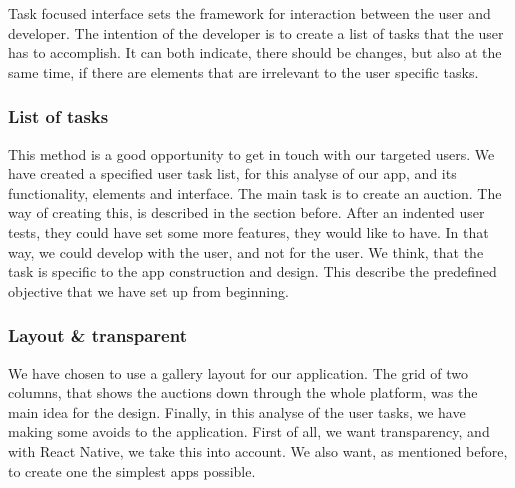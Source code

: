 Task focused interface sets the framework for interaction between the user and developer. The intention of the developer is to create a list of tasks that the user has to accomplish. It can both indicate, there should be changes, but also at the same time, if there are elements that are irrelevant to the user specific tasks.

\subsubsection*{List of tasks}
This method is a good opportunity to get in touch with our targeted users. We have created a specified user task list, for this analyse of our app, and its functionality, elements and interface. The main task is to create an auction. The way of creating this, is described in the section before. After an indented user tests, they could have set some more features, they would like to have. In that way, we could develop with the user, and not for the user. 
We think, that the task is specific to the app construction and design. This describe the predefined objective that we have set up from beginning.

\subsubsection*{Layout \& transparent}
We have chosen to use a gallery layout for our application. The grid of two columns, that shows the auctions down through the whole platform, was the main idea for the design. 
Finally, in this analyse of the user tasks, we have making some avoids to the application. First of all, we want transparency, and with React Native, we take this into account. We also want, as mentioned before, to create one the simplest apps possible. 
